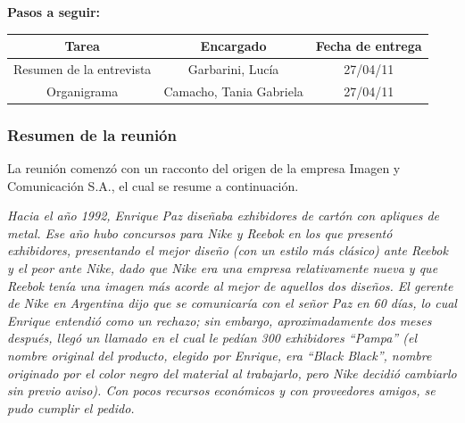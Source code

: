 \documentclass[a4paper,10pt,titlepage]{article}
\begin{document}
\begin{itemize}
%
%

\textbf{Pasos a seguir:}\\
\begin{center}
\begin{tabular}{|c|c|c|}
	\hline \textbf{Tarea} & \textbf{Encargado} & \textbf{Fecha de entrega} \\ 
	\hline Resumen de la entrevista & Garbarini, Luc\'ia & 27/04/11 \\ 
	\hline Organigrama & Camacho, Tania Gabriela & 27/04/11 \\ 
	\hline 
\end{tabular}
\end{center}

\newpage
\subsubsection*{Resumen de la reuni\'on}
La reunión comenzó con un racconto del origen de la empresa Imagen y Comunicaci\'on S.A., el cual se resume a continuaci\'on.


\textit{Hacia el año 1992, Enrique Paz diseñaba exhibidores de cart\'on con apliques de metal. 
Ese año hubo concursos para Nike y Reebok en los que present\'o exhibidores, presentando el mejor diseño (con un estilo m\'as cl\'asico) ante Reebok y el peor ante Nike, dado que Nike era una empresa relativamente nueva y que Reebok ten\'ia una imagen m\'as acorde al mejor de aquellos dos diseños.
El gerente de Nike en Argentina dijo que se comunicar\'ia con el señor Paz en 60 d\'ias, lo cual Enrique entendi\'o como un rechazo; sin embargo, aproximadamente dos meses despu\'es, lleg\'o un llamado en el cual le ped\'ian 300 exhibidores ``Pampa'' (el nombre original del producto, elegido por Enrique, era ``Black Black'', nombre originado por el color negro del material al trabajarlo, pero Nike decidi\'o cambiarlo sin previo aviso).
Con pocos recursos econ\'omicos y con proveedores amigos, se pudo cumplir el pedido.}



\end{itemize}
\end{document}
